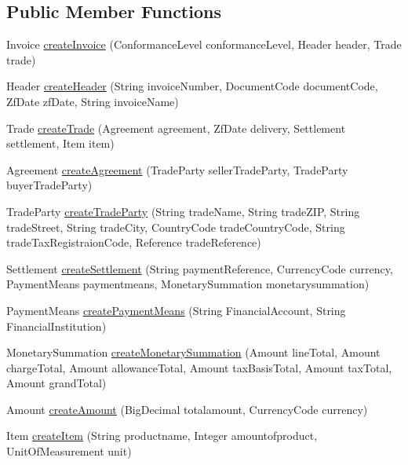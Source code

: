 \subsection*{Public Member Functions}
\begin{DoxyCompactItemize}
\item 
Invoice \hyperlink{class_invoice_1_1_invoice_facade_aed040de23d9a331b0964454530fc7988}{create\+Invoice} (Conformance\+Level conformance\+Level, Header header, Trade trade)
\item 
Header \hyperlink{class_invoice_1_1_invoice_facade_a788d5f0208e4d099614f8e458e086a94}{create\+Header} (String invoice\+Number, Document\+Code document\+Code, Zf\+Date zf\+Date, String invoice\+Name)
\item 
Trade \hyperlink{class_invoice_1_1_invoice_facade_acae1a0db0b9892a21491203e61e057ae}{create\+Trade} (Agreement agreement, Zf\+Date delivery, Settlement settlement, Item item)
\item 
Agreement \hyperlink{class_invoice_1_1_invoice_facade_a8287347eba1c2940fd72e4899b8fe986}{create\+Agreement} (Trade\+Party seller\+Trade\+Party, Trade\+Party buyer\+Trade\+Party)
\item 
Trade\+Party \hyperlink{class_invoice_1_1_invoice_facade_ac2ba29fdf1bafc137241beff29d2bdba}{create\+Trade\+Party} (String trade\+Name, String trade\+Z\+IP, String trade\+Street, String trade\+City, Country\+Code trade\+Country\+Code, String trade\+Tax\+Registraion\+Code, Reference trade\+Reference)
\item 
Settlement \hyperlink{class_invoice_1_1_invoice_facade_ae345a8b9a50494d0585e12d2eaf70c80}{create\+Settlement} (String payment\+Reference, Currency\+Code currency, Payment\+Means paymentmeans, Monetary\+Summation monetarysummation)
\item 
Payment\+Means \hyperlink{class_invoice_1_1_invoice_facade_aac53eeb83c4623ff079a4d68401a15a0}{create\+Payment\+Means} (String Financial\+Account, String Financial\+Institution)
\item 
Monetary\+Summation \hyperlink{class_invoice_1_1_invoice_facade_ac28bd91536a4ba2dc3559f28aaf550a6}{create\+Monetary\+Summation} (Amount line\+Total, Amount charge\+Total, Amount allowance\+Total, Amount tax\+Basis\+Total, Amount tax\+Total, Amount grand\+Total)
\item 
Amount \hyperlink{class_invoice_1_1_invoice_facade_a9c1987ca0c7c3c8dcf92ed63e0ba0c04}{create\+Amount} (Big\+Decimal totalamount, Currency\+Code currency)
\item 
Item \hyperlink{class_invoice_1_1_invoice_facade_adf0363c76d0220cded9a07a4ef5c5629}{create\+Item} (String productname, Integer amountofproduct, Unit\+Of\+Measurement unit)
\end{DoxyCompactItemize}
